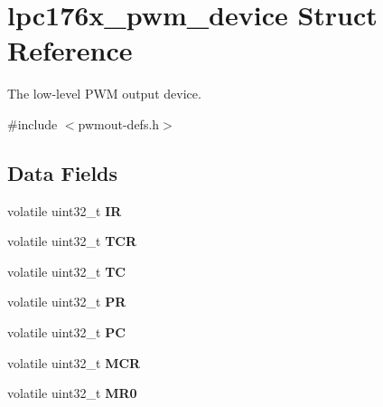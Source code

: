 \hypertarget{structlpc176x__pwm__device}{}\section{lpc176x\+\_\+pwm\+\_\+device Struct Reference}
\label{structlpc176x__pwm__device}


The low-\/level P\+WM output device.  




{\ttfamily \#include $<$pwmout-\/defs.\+h$>$}

\subsection*{Data Fields}
\begin{DoxyCompactItemize}
\item 
\mbox{\label{structlpc176x__pwm__device_ae8f0c36cc1c8a85345a953898f6ed3e8}} 
volatile uint32\+\_\+t {\bfseries IR}
\item 
\mbox{\label{structlpc176x__pwm__device_a93f4025927c7e265b495bf61895b7753}} 
volatile uint32\+\_\+t {\bfseries T\+CR}
\item 
\mbox{\label{structlpc176x__pwm__device_a5f101a1ddfc2231ef9b49f0cfc6f3351}} 
volatile uint32\+\_\+t {\bfseries TC}
\item 
\mbox{\label{structlpc176x__pwm__device_aff90320bc9a7af9523f7fc44a75812ad}} 
volatile uint32\+\_\+t {\bfseries PR}
\item 
\mbox{\label{structlpc176x__pwm__device_aff2f004af3cb6a9767ee3bd7118cb6ba}} 
volatile uint32\+\_\+t {\bfseries PC}
\item 
\mbox{\label{structlpc176x__pwm__device_a51800ed37a865e29bc75b15cac2630a9}} 
volatile uint32\+\_\+t {\bfseries M\+CR}
\item 
\mbox{\label{structlpc176x__pwm__device_a093b97733759844049dd0c55d6c25349}} 
volatile uint32\+\_\+t {\bfseries M\+R0}
\item 
\mbox{\label{structlpc176x__pwm__device_a9e47390c1785e68938854dd1f26d2f66}} 

\end{DoxyCompactItemize}
